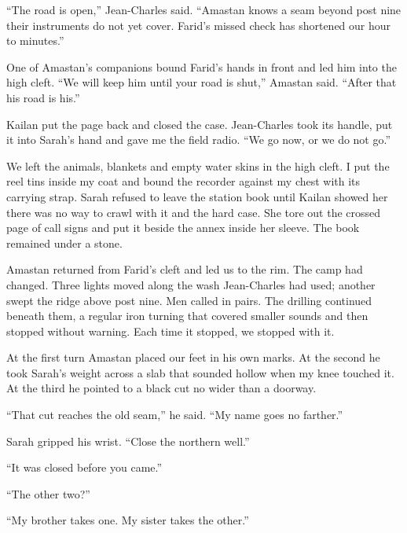 ``The road is open,'' Jean-Charles said. ``Amastan knows a seam beyond post nine their instruments do not yet cover. Farid's missed check has shortened our hour to minutes.''\par

One of Amastan's companions bound Farid's hands in front and led him into the high cleft. ``We will keep him until your road is shut,'' Amastan said. ``After that his road is his.''\par

Kailan put the page back and closed the case. Jean-Charles took its handle, put it into Sarah's hand and gave me the field radio. ``We go now, or we do not go.''\par

We left the animals, blankets and empty water skins in the high cleft. I put the reel tins inside my coat and bound the recorder against my chest with its carrying strap. Sarah refused to leave the station book until Kailan showed her there was no way to crawl with it and the hard case. She tore out the crossed page of call signs and put it beside the annex inside her sleeve. The book remained under a stone.\par

Amastan returned from Farid's cleft and led us to the rim. The camp had changed. Three lights moved along the wash Jean-Charles had used; another swept the ridge above post nine. Men called in pairs. The drilling continued beneath them, a regular iron turning that covered smaller sounds and then stopped without warning. Each time it stopped, we stopped with it.\par

At the first turn Amastan placed our feet in his own marks. At the second he took Sarah's weight across a slab that sounded hollow when my knee touched it. At the third he pointed to a black cut no wider than a doorway.\par

``That cut reaches the old seam,'' he said. ``My name goes no farther.''\par

Sarah gripped his wrist. ``Close the northern well.''\par

``It was closed before you came.''\par

``The other two?''\par

``My brother takes one. My sister takes the other.''\par

